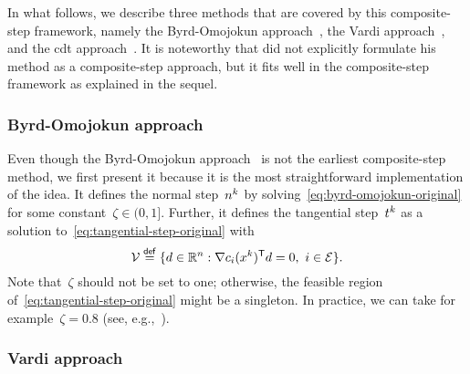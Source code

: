 In what follows, we describe three methods that are covered by this composite-step framework, namely the Byrd-Omojokun approach~\cite{Byrd_1987,Omojokun_1989}, the Vardi approach~\cite{Vardi_1985}, and the \gls{cdt} approach~\cite{Celis_Dennis_Tapia_1985}.
It is noteworthy that \citeauthor{Vardi_1985} did not explicitly formulate his method as a composite-step approach, but it fits well in the composite-step framework as explained in the sequel.

\subsubsection{Byrd-Omojokun approach}

Even though the Byrd-Omojokun approach~\cite{Byrd_1987,Omojokun_1989} is not the earliest composite-step method, we first present it because it is the most straightforward implementation of the idea.
It defines the normal step~$\nstep[k]$ by solving~\cref{eq:byrd-omojokun-original} for some constant~$\zeta \in (0, 1]$\nomenclature[Sd]{$(a, b]$}{Semi-open set~$\set{\iter \in \R : a < \iter \le b}$ with~$a < b$}.
Further, it defines the tangential step~$\tstep[k]$ as a solution to~\cref{eq:tangential-step-original} with
\begin{equation}
    \label{eq:tangential-subproblem-feasible-set}
    \mathcal{V} \eqdef \set{\step \in \R^n : \nabla \con{i}(\iter[k])^{\T} \step = 0, ~ i \in \ieq}.
\end{equation}
Note that~$\zeta$ should not be set to one; otherwise, the feasible region of~\cref{eq:tangential-step-original} might be a singleton.
In practice, we can take for example~$\zeta = 0.8$ (see, e.g.,~\cite[Eq.~(18.45)]{Nocedal_Wright_2006}).

\subsubsection{Vardi approach}

